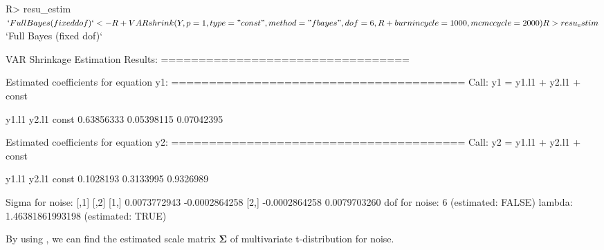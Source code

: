 \documentclass[
]{jss}
\begin{document}
\begin{CodeChunk}

\begin{CodeInput}
R> resu_estim$`Full Bayes (fixed dof)` <-
R+   VARshrink(Y, p = 1, type = "const", method = "fbayes", dof = 6,
R+                      burnincycle = 1000, mcmccycle = 2000)
R> resu_estim$`Full Bayes (fixed dof)`
\end{CodeInput}

\begin{CodeOutput}

VAR Shrinkage Estimation Results:
================================= 

Estimated coefficients for equation y1: 
======================================= 
Call:
y1 = y1.l1 + y2.l1 + const 

     y1.l1      y2.l1      const 
0.63856333 0.05398115 0.07042395 


Estimated coefficients for equation y2: 
======================================= 
Call:
y2 = y1.l1 + y2.l1 + const 

    y1.l1     y2.l1     const 
0.1028193 0.3133995 0.9326989 


Sigma for noise:
              [,1]          [,2]
[1,]  0.0073772943 -0.0002864258
[2,] -0.0002864258  0.0079703260
dof for noise: 6 (estimated: FALSE) 
lambda: 1.46381861993198 (estimated: TRUE) 
\end{CodeOutput}
\end{CodeChunk}

By using , we can find the estimated scale matrix
\(\mathbf{\Sigma}\) of multivariate t-distribution for noise.
\end{document}
